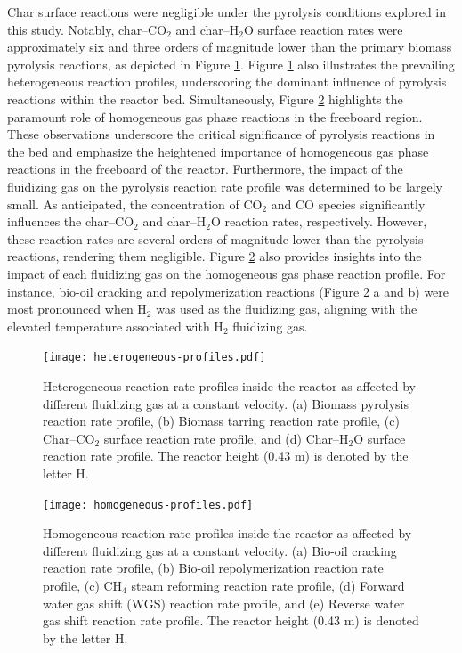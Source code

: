 \documentclass{article}
\begin{document}
Char surface reactions were negligible under the pyrolysis conditions explored in this study. Notably, char--CO$_2$ and char--H$_2$O surface reaction rates were approximately six and three orders of magnitude lower than the primary biomass pyrolysis reactions, as depicted in Figure \ref{fig:heterogeneous-profiles}. Figure \ref{fig:heterogeneous-profiles} also illustrates the prevailing heterogeneous reaction profiles, underscoring the dominant influence of pyrolysis reactions within the reactor bed. Simultaneously, Figure \ref{fig:homogeneous-profiles} highlights the paramount role of homogeneous gas phase reactions in the freeboard region. These observations underscore the critical significance of pyrolysis reactions in the bed and emphasize the heightened importance of homogeneous gas phase reactions in the freeboard of the reactor. Furthermore, the impact of the fluidizing gas on the pyrolysis reaction rate profile was determined to be largely small. As anticipated, the concentration of CO$_2$ and CO species significantly influences the char--CO$_2$ and char--H$_2$O reaction rates, respectively. However, these reaction rates are several orders of magnitude lower than the pyrolysis reactions, rendering them negligible. Figure \ref{fig:homogeneous-profiles} also provides insights into the impact of each fluidizing gas on the homogeneous gas phase reaction profile. For instance, bio-oil cracking and repolymerization reactions (Figure \ref{fig:homogeneous-profiles} a and b) were most pronounced when H$_2$ was used as the fluidizing gas, aligning with the elevated temperature associated with H$_2$ fluidizing gas.

\begin{figure}[H]
    \centering
    \texttt{[image: heterogeneous-profiles.pdf]}
    \caption{Heterogeneous reaction rate profiles inside the reactor as affected by different fluidizing gas at a constant velocity. (a) Biomass pyrolysis reaction rate profile, (b) Biomass tarring reaction rate profile, (c) Char--CO$_2$ surface reaction rate profile, and (d) Char--H$_2$O surface reaction rate profile. The reactor height (0.43 m) is denoted by the letter H.}
    \label{fig:heterogeneous-profiles}
\end{figure}

\begin{figure}[H]
    \centering
    \texttt{[image: homogeneous-profiles.pdf]}
    \caption{Homogeneous reaction rate profiles inside the reactor as affected by different fluidizing gas at a constant velocity. (a) Bio-oil cracking reaction rate profile, (b) Bio-oil repolymerization reaction rate profile, (c) CH$_4$ steam reforming reaction rate profile, (d) Forward water gas shift (WGS) reaction rate profile, and (e) Reverse water gas shift reaction rate profile. The reactor height (0.43 m) is denoted by the letter H.}
    \label{fig:homogeneous-profiles}
\end{figure}
\end{document}
